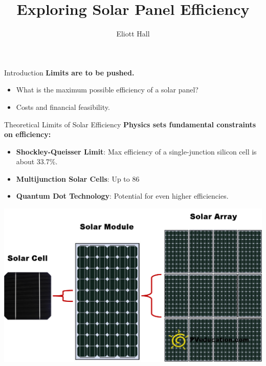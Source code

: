 \documentclass[aspectratio=169]{beamer} %
\title{Exploring Solar Panel Efficiency}
\author{Eliott Hall}
\begin{document}
\frame{\titlepage}

\begin{frame}{Introduction}
    \textbf{Limits are to be pushed.}
    \begin{itemize}
        \item What is the maximum possible efficiency of a solar panel?
        \item Costs and financial feasibility.
    \end{itemize}
\end{frame}

\begin{frame}{Theoretical Limits of Solar Efficiency}
    \textbf{Physics sets fundamental constraints on efficiency:}
    \begin{itemize}
        \item \textbf{Shockley-Queisser Limit}: Max efficiency of a single-junction silicon cell is about 33.7\%.
        \item \textbf{Multijunction Solar Cells}: Up to 86%
        \item \textbf{Quantum Dot Technology}: Potential for even higher efficiencies.
    \end{itemize}
    \centering
    \includegraphics[width=0.7\linewidth]{solar_cells.png} %
\end{frame}
\end{document}
